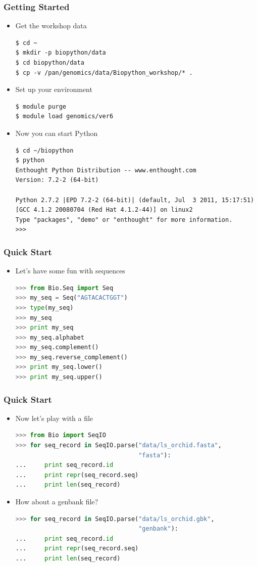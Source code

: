 \documentclass[xcolor=table,10pt,final]{beamer}
\begin{document}
\begin{frame}[fragile]
	\frametitle{Getting Started}
	\begin{itemize}
		\item<1-> Get the workshop data
			{\small
		      \begin{verbatim}
$ cd ~
$ mkdir -p biopython/data
$ cd biopython/data
$ cp -v /pan/genomics/data/Biopython_workshop/* .
		      \end{verbatim}
			}
		\item<2-> Set up your environment
			{\small
		          \begin{verbatim}
$ module purge
$ module load genomics/ver6
		          \end{verbatim}
			}
		\item<3-> Now you can start Python
			{\small
			\begin{verbatim}
$ cd ~/biopython
$ python
Enthought Python Distribution -- www.enthought.com
Version: 7.2-2 (64-bit)

Python 2.7.2 |EPD 7.2-2 (64-bit)| (default, Jul  3 2011, 15:17:51) 
[GCC 4.1.2 20080704 (Red Hat 4.1.2-44)] on linux2
Type "packages", "demo" or "enthought" for more information.
>>> 
			\end{verbatim}
			}
	\end{itemize}
\end{frame}


\begin{frame}[fragile]
	\frametitle{Quick Start}
	\begin{itemize}
		\item Let's have some fun with sequences
			\begin{lstlisting}[language=python]
>>> from Bio.Seq import Seq 
>>> my_seq = Seq("AGTACACTGGT")
>>> type(my_seq)
>>> my_seq
>>> print my_seq
>>> my_seq.alphabet
>>> my_seq.complement()
>>> my_seq.reverse_complement()
>>> print my_seq.lower()
>>> print my_seq.upper()
			\end{lstlisting}
	\end{itemize}
\end{frame}


\begin{frame}[fragile]
	\frametitle{Quick Start}
	\begin{itemize}
		\item Now let's play with a file
			\begin{lstlisting}[language=python]
>>> from Bio import SeqIO
>>> for seq_record in SeqIO.parse("data/ls_orchid.fasta",
                                  "fasta"):
...     print seq_record.id
...     print repr(seq_record.seq)
...     print len(seq_record)
			\end{lstlisting}
		\item How about a genbank file?
			\begin{lstlisting}[language=python]
>>> for seq_record in SeqIO.parse("data/ls_orchid.gbk",
                                  "genbank"):
...     print seq_record.id
...     print repr(seq_record.seq)
...     print len(seq_record)
			\end{lstlisting}
	\end{itemize}
\end{frame}
\end{document}
